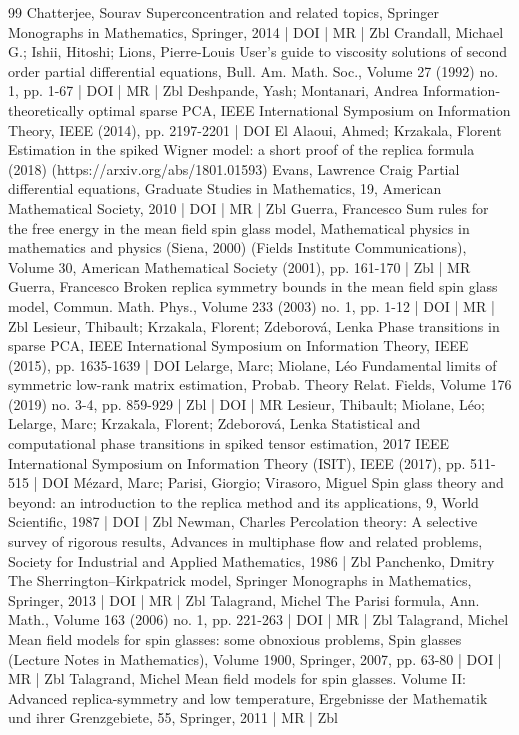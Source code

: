 \documentclass[10pt]{amsart}
\theoremstyle{definition}\newtheorem{defi}[theo]{Definition}\newtheorem{rema}[theo]{Remark}\newtheorem{exam}[theo]{Example}\newtheorem{exem}[theo]{Example}\newtheorem{nota}[theo]{Notation}
\newcommand{\1}{\mathds{1}}
\begin{document}
\begin{thebibliography}{99}
Chatterjee, Sourav Superconcentration and related topics, Springer Monographs in Mathematics, Springer, 2014 | DOI | MR | Zbl
Crandall, Michael G.; Ishii, Hitoshi; Lions, Pierre-Louis User’s guide to viscosity solutions of second order partial differential equations, Bull. Am. Math. Soc., Volume 27 (1992) no. 1, pp. 1-67 | DOI | MR | Zbl
Deshpande, Yash; Montanari, Andrea Information-theoretically optimal sparse PCA, IEEE International Symposium on Information Theory, IEEE (2014), pp. 2197-2201 | DOI
El Alaoui, Ahmed; Krzakala, Florent Estimation in the spiked Wigner model: a short proof of the replica formula (2018) (https://arxiv.org/abs/1801.01593)
Evans, Lawrence Craig Partial differential equations, Graduate Studies in Mathematics, 19, American Mathematical Society, 2010 | DOI | MR | Zbl
Guerra, Francesco Sum rules for the free energy in the mean field spin glass model, Mathematical physics in mathematics and physics (Siena, 2000) (Fields Institute Communications), Volume 30, American Mathematical Society (2001), pp. 161-170 | Zbl | MR
Guerra, Francesco Broken replica symmetry bounds in the mean field spin glass model, Commun. Math. Phys., Volume 233 (2003) no. 1, pp. 1-12 | DOI | MR | Zbl
Lesieur, Thibault; Krzakala, Florent; Zdeborová, Lenka Phase transitions in sparse PCA, IEEE International Symposium on Information Theory, IEEE (2015), pp. 1635-1639 | DOI
Lelarge, Marc; Miolane, Léo Fundamental limits of symmetric low-rank matrix estimation, Probab. Theory Relat. Fields, Volume 176 (2019) no. 3-4, pp. 859-929 | Zbl | DOI | MR
Lesieur, Thibault; Miolane, Léo; Lelarge, Marc; Krzakala, Florent; Zdeborová, Lenka Statistical and computational phase transitions in spiked tensor estimation, 2017 IEEE International Symposium on Information Theory (ISIT), IEEE (2017), pp. 511-515 | DOI
Mézard, Marc; Parisi, Giorgio; Virasoro, Miguel Spin glass theory and beyond: an introduction to the replica method and its applications, 9, World Scientific, 1987 | DOI | Zbl
Newman, Charles Percolation theory: A selective survey of rigorous results, Advances in multiphase flow and related problems, Society for Industrial and Applied Mathematics, 1986 | Zbl
Panchenko, Dmitry The Sherrington–Kirkpatrick model, Springer Monographs in Mathematics, Springer, 2013 | DOI | MR | Zbl
Talagrand, Michel The Parisi formula, Ann. Math., Volume 163 (2006) no. 1, pp. 221-263 | DOI | MR | Zbl
Talagrand, Michel Mean field models for spin glasses: some obnoxious problems, Spin glasses (Lecture Notes in Mathematics), Volume 1900, Springer, 2007, pp. 63-80 | DOI | MR | Zbl
Talagrand, Michel Mean field models for spin glasses. Volume II: Advanced replica-symmetry and low temperature, Ergebnisse der Mathematik und ihrer Grenzgebiete, 55, Springer, 2011 | MR | Zbl
\end{thebibliography}
\end{document}
